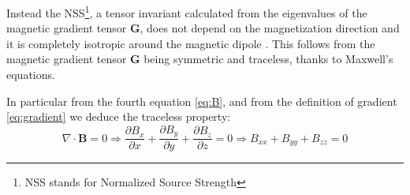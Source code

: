 Instead the NSS\footnote{NSS stands for Normalized Source Strength}, a tensor invariant calculated 
from the eigenvalues of the magnetic gradient tensor $\mathbf{G}$, 
does not depend on the magnetization direction and it 
is completely isotropic around the magnetic dipole \cite{multiple_real_plots_invariants}.
This follows from the magnetic gradient tensor $\mathbf{G}$ being symmetric and traceless,
thanks to Maxwell's equations.

In particular from the fourth equation \ref{eq:B}, 
and from the definition of gradient \ref{eq:gradient} we deduce the traceless property:
\begin{equation}
    \nabla \cdot \mathbf{B} = 0
    \Rightarrow
    \frac{\partial B_x}{\partial x} +\frac{\partial B_y}{\partial y} + \frac{\partial B_z}{\partial z} = 0
    \Rightarrow
    B_{xx} + B_{yy} + B_{zz} = 0
\end{equation}

